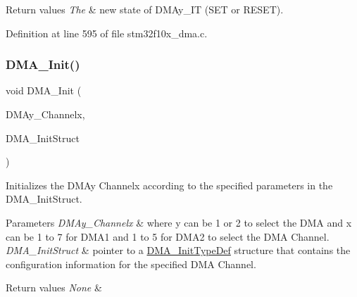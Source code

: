 \begin{DoxyRetVals}{Return values}
{\em The} & new state of D\+M\+Ay\+\_\+\+IT (S\+ET or R\+E\+S\+ET). \\
\hline
\end{DoxyRetVals}


Definition at line 595 of file stm32f10x\+\_\+dma.\+c.

\mbox{\label{group___d_m_a___private___functions_ga7c3d1b9dc041f8e5f2cfc8d5dd858278}} 
\subsubsection{\texorpdfstring{D\+M\+A\+\_\+\+Init()}{DMA\_Init()}}
{\footnotesize\ttfamily void D\+M\+A\+\_\+\+Init (\begin{DoxyParamCaption}\item[{\hyperlink{struct_d_m_a___channel___type_def}{D\+M\+A\+\_\+\+Channel\+\_\+\+Type\+Def} $\ast$}]{D\+M\+Ay\+\_\+\+Channelx,  }\item[{\hyperlink{struct_d_m_a___init_type_def}{D\+M\+A\+\_\+\+Init\+Type\+Def} $\ast$}]{D\+M\+A\+\_\+\+Init\+Struct }\end{DoxyParamCaption})}



Initializes the D\+M\+Ay Channelx according to the specified parameters in the D\+M\+A\+\_\+\+Init\+Struct. 


\begin{DoxyParams}{Parameters}
{\em D\+M\+Ay\+\_\+\+Channelx} & where y can be 1 or 2 to select the D\+MA and x can be 1 to 7 for D\+M\+A1 and 1 to 5 for D\+M\+A2 to select the D\+MA Channel. \\
\hline
{\em D\+M\+A\+\_\+\+Init\+Struct} & pointer to a \hyperlink{struct_d_m_a___init_type_def}{D\+M\+A\+\_\+\+Init\+Type\+Def} structure that contains the configuration information for the specified D\+MA Channel. \\
\hline
\end{DoxyParams}

\begin{DoxyRetVals}{Return values}
{\em None} & \\
\hline
\end{DoxyRetVals}


